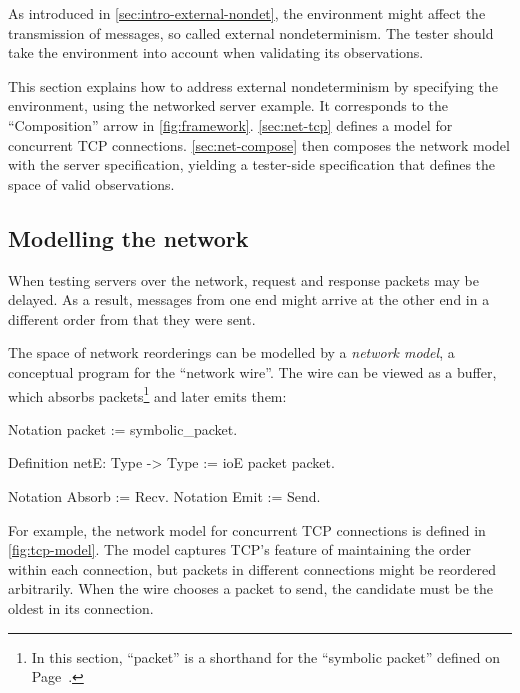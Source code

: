 As introduced in \autoref{sec:intro-external-nondet}, the environment might
affect the transmission of messages, so called external nondeterminism.  The
tester should take the environment into account when validating its
observations.

This section explains how to address external nondeterminism by specifying the
environment, using the networked server example.  It corresponds to the
``Composition'' arrow in \autoref{fig:framework}.  \autoref{sec:net-tcp} defines
a model for concurrent TCP connections.  \autoref{sec:net-compose} then composes
the network model with the server specification, yielding a tester-side
specification that defines the space of valid observations.

\subsection{Modelling the network}
\label{sec:net-tcp}
When testing servers over the network, request and response packets may be
delayed.  As a result, messages from one end might arrive at the
other end in a different order from that they were sent.

The space of network reorderings can be modelled by a {\em network model}, a
conceptual program for the ``network wire''.  The wire can be viewed as a
buffer, which absorbs packets\footnote{In this section, ``packet'' is a
shorthand for the ``symbolic packet'' defined on
Page~\pageref{def:symbolic-packet}.} and later emits them:
\begin{coq}
  Notation packet := symbolic_packet.

  Definition netE: Type -> Type :=
    ioE packet packet.

  Notation Absorb := Recv.
  Notation Emit   := Send.
\end{coq}

For example, the network model for concurrent TCP connections is defined in
\autoref{fig:tcp-model}.  The model captures TCP's feature of maintaining the
order within each connection, but packets in different connections might be
reordered arbitrarily.  When the wire chooses a packet to send, the candidate
must be the oldest in its connection.


